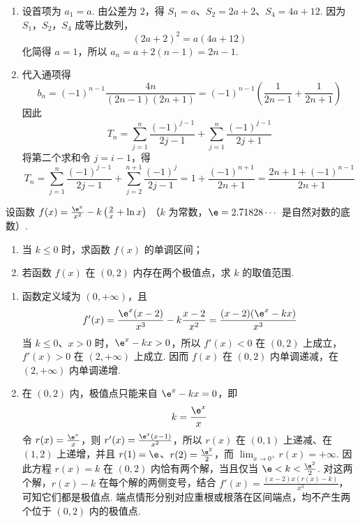 \begin{solution}
\begin{enumerate}
\item 设首项为 \(a_1=a\). 由公差为 \(2\)，得
\(S_1=a\)、\(S_2=2a+2\)、\(S_4=4a+12\). 因为 \(S_1\)，\(S_2\)，\(S_4\) 成等比数列，
\[
(2a+2)^2=a(4a+12)
\]
化简得 \(a=1\)，所以
\(a_n=a+2(n-1)=2n-1\).
\item 代入通项得
\[
b_n=(-1)^{n-1}\frac{4n}{(2n-1)(2n+1)}
=(-1)^{n-1}\left(\frac1{2n-1}+\frac1{2n+1}\right)
\]
因此
\[
T_n=\sum_{j=1}^n\frac{(-1)^{j-1}}{2j-1}
 +\sum_{j=1}^n\frac{(-1)^{j-1}}{2j+1}
\]
将第二个求和令 \(j=i-1\)，得
\[
T_n=\sum_{j=1}^n\frac{(-1)^{j-1}}{2j-1}
 +\sum_{j=2}^{n+1}\frac{(-1)^j}{2j-1}
 =1+\frac{(-1)^{n+1}}{2n+1}
 =\frac{2n+1+(-1)^{n-1}}{2n+1}
\]
\end{enumerate}
\end{solution}

\begin{problem}
设函数 \( f(x) = \frac{\e^x}{x^2} - k\left(\frac{2}{x} + \ln x\right) \) （\( k \) 为常数，\(\e = 2.71828 \cdots \) 是自然对数的底数）.

\begin{enumerate}
\item 当 \(k \leqslant 0\) 时，求函数 \(f(x)\) 的单调区间；
\item 若函数 \( f(x) \) 在 \((0,2)\) 内存在两个极值点，求 \( k \) 的取值范围.
\end{enumerate}
\end{problem}

\begin{solution}
\begin{enumerate}
\item 函数定义域为 \((0,+\infty)\)，且
\[
f'(x)=\frac{\e^x(x-2)}{x^3}-k\frac{x-2}{x^2}
=\frac{(x-2)(\e^x-kx)}{x^3}
\]
当 \(k\leqslant0\)、\(x>0\) 时，\(\e^x-kx>0\)，所以 \(f'(x)<0\) 在 \((0,2)\) 上成立，\(f'(x)>0\) 在 \((2,+\infty)\) 上成立. 因而 \(f(x)\) 在 \((0,2)\) 内单调递减，在 \((2,+\infty)\) 内单调递增.
\item 在 \((0,2)\) 内，极值点只能来自 \(\e^x-kx=0\)，即
\[
k=\frac{\e^x}{x}
\]
令 \(r(x)=\frac{\e^x}{x}\)，则
\(r'(x)=\frac{\e^x(x-1)}{x^2}\)，所以 \(r(x)\) 在 \((0,1)\) 上递减、在 \((1,2)\) 上递增，并且 \(r(1)=\e\)、\(r(2)=\frac{\e^2}{2}\)，而 \(\displaystyle\lim_{x\to0^+}r(x)=+\infty\). 因此方程 \(r(x)=k\) 在 \((0,2)\) 内恰有两个解，当且仅当
\(\e<k<\frac{\e^2}{2}\). 对这两个解，\(r(x)-k\) 在每个解的两侧变号，结合 \(f'(x)=\frac{(x-2)x(r(x)-k)}{x^3}\)，可知它们都是极值点. 端点情形分别对应重根或根落在区间端点，均不产生两个位于 \((0,2)\) 内的极值点.
\end{enumerate}
\end{solution}

